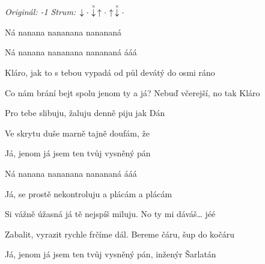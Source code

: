 \begin{song}


\begin{headerbox}
\RaiseBoxWithChucks
\textit{Originál: -1} \quad
\textit{Strum:} $\Down\Miss\ChuckDown\Up\Miss\Up\ChuckDown\Miss$
\end{headerbox}

\begin{hchordbox}
\end{hchordbox}

\large

\bigskip

Ná nanana nananana nanananá   \par
{}Ná nanana nananana nanananá ááá \par

\bigskip

Kláro, jak to s tebou vypadá od půl devátý do osmi ráno \par
Co nám brání bejt spolu jenom ty a já? Nebuď včerejší, no tak Kláro \par
Pro tebe slibuju, žaluju denně piju jak Dán \par
{} Ve skrytu duše marně tajně doufám, že \par
{}Já, jenom já jsem ten tvůj vysněný pán  \par

\bigskip

Ná nanana nananana nanananá ááá \par

\bigskip

Já, se prostě nekontroluju a plácám a plácám \par
Si vážně úžasná já tě nejspíš miluju. No ty mi dáváš… jéé \par
{}Zabalit, vyrazit rychle frčíme dál.  Bereme čáru,  šup do kočáru \par
{}Já, jenom já jsem ten tvůj vysněný pán, inženýr Šarlatán \par

\bigskip


\end{song}
